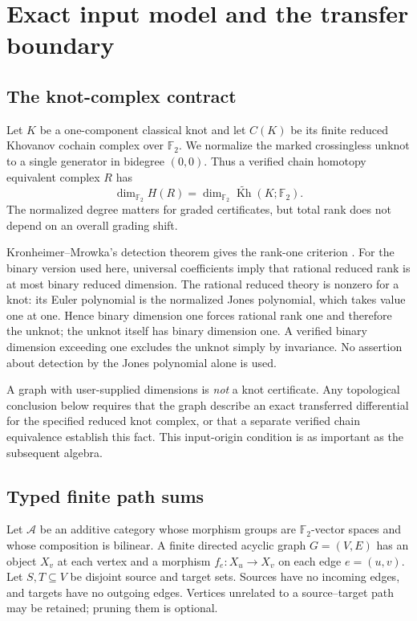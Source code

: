 \documentclass[11pt,letterpaper]{article}
\theoremstyle{definition}\newtheorem{definition}[theorem]{Definition}
\theoremstyle{remark}\newtheorem{remark}[theorem]{Remark}
\newcommand{\F}{\mathbb F_2}
\newcommand{\Kh}{\widetilde{\operatorname{Kh}}}
\begin{document}
\section{Exact input model and the transfer boundary}
\subsection{The knot-complex contract}
Let $K$ be a one-component classical knot and let $C(K)$ be its finite reduced
Khovanov cochain complex over $\F$. We normalize the marked crossingless
unknot to a single generator in bidegree $(0,0)$. Thus a verified chain
homotopy equivalent complex $R$ has
\[
\dim_{\F}H(R)=\dim_{\F}\Kh(K;\F).
\]
The normalized degree matters for graded certificates, but total rank does
not depend on an overall grading shift.

Kronheimer--Mrowka's detection theorem gives the rank-one criterion
\cite{km2011}. For the binary version used here, universal coefficients imply
that rational reduced rank is at most binary reduced dimension. The rational
reduced theory is nonzero for a knot: its Euler polynomial is the normalized
Jones polynomial, which takes value one at one. Hence binary dimension one
forces rational rank one and therefore the unknot; the unknot itself has
binary dimension one. A verified binary dimension exceeding one excludes
the unknot simply by invariance. No assertion about detection by the Jones
polynomial alone is used.

A graph with user-supplied dimensions is \emph{not} a knot certificate.
Any topological conclusion below requires that the graph describe an exact
transferred differential for the specified reduced knot complex, or that a
separate verified chain equivalence establish this fact. This input-origin
condition is as important as the subsequent algebra.

\subsection{Typed finite path sums}
Let $\mathcal A$ be an additive category whose morphism groups are
$\F$-vector spaces and whose composition is bilinear. A finite directed
acyclic graph $G=(V,E)$ has an object $X_v$ at each vertex and a morphism
$f_e:X_u\to X_v$ on each edge $e=(u,v)$. Let $S,T\subseteq V$ be disjoint
source and target sets. Sources have no incoming edges, and targets have no
outgoing edges. Vertices unrelated to a source--target path may be retained;
pruning them is optional.
\end{document}
